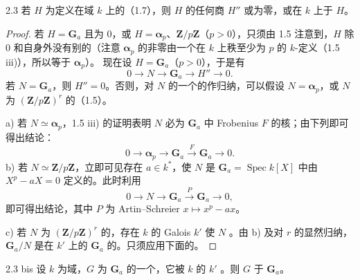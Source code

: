 \begin{SGAresult}{}{2.3}
若 $H$ 为定义在域 $k$ 上的（1.7），则 $H$ 的任何商 $H''$ 或为零，或在 $k$ 上于 $H$。
\end{SGAresult}
\begin{proof}
若 $H=\mathbf G_a$ 且为 $0$，或 $H=\boldsymbol\alpha_p$、$\mathbf Z/p\mathbf Z$（$p>0$），只须由 1.5 注意到，$H$ 除 $0$ 和自身外没有别的（注意 $\boldsymbol\alpha_p$ 的非零由一个在 $k$ 上秩至少为 $p$ 的 $k$-定义（1.5 iii)），所以等于 $\boldsymbol\alpha_p$）。
现在设 $H=\mathbf G_a$（$p>0$），于是有
\[0\longrightarrow N\longrightarrow\mathbf G_a\longrightarrow H''\longrightarrow0.\]
若 $N=\mathbf G_a$，则 $H''=0$。否则，对 $N$ 的一个的作归纳，可以假设 $N=\boldsymbol\alpha_p$，或 $N$ 为 $(\mathbf Z/p\mathbf Z)^r$ 的（1.5）。

a) 若 $N\simeq\boldsymbol\alpha_p$，1.5 iii) 的证明表明 $N$ 必为 $\mathbf G_a$ 中 Frobenius  $F$ 的核；由下列即可得出结论：
\[0\longrightarrow\boldsymbol\alpha_p\longrightarrow\mathbf G_a\xrightarrow{F}\mathbf G_a\longrightarrow0.\]
b) 若 $N\simeq\mathbf Z/p\mathbf Z$，立即可见存在 $a\in k^*$，使 $N$ 是 $\mathbf G_a=\operatorname{Spec}k[X]$ 中由 $X^p-aX=0$ 定义的。此时利用
\[0\longrightarrow N\longrightarrow\mathbf G_a\xrightarrow{P}\mathbf G_a\longrightarrow0,\]
即可得出结论，其中 $P$ 为 Artin--Schreier  $x\mapsto x^p-ax$。

c) 若 $N$ 为 $(\mathbf Z/p\mathbf Z)^r$ 的，存在 $k$ 的 Galois  $k'$ 使 $N$ 。由 b) 及对 $r$ 的显然归纳，$\mathbf G_a/N$ 是在 $k'$ 上的 $\mathbf G_a$ 的。只须应用下面的。
\end{proof}
\begin{SGAresult}{}{2.3 bis}
设 $k$ 为域，$G$ 为 $\mathbf G_a$ 的一个，它被 $k$ 的 $k'$ 。则 $G$ 于 $\mathbf G_a$。
\end{SGAresult}
